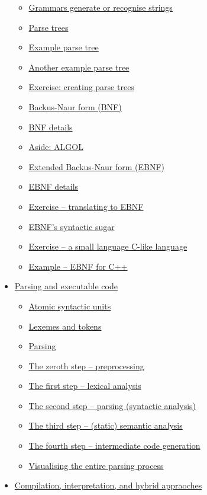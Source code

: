 \documentclass[11pt]{article}
\theoremstyle{definition}
\begin{document}
\begin{scriptsize}
\begin{itemize}
\begin{itemize}
\item \hyperref[sec:org4f12455]{Grammars generate or recognise strings}
\item \hyperref[sec:orga475d8c]{Parse trees}
\item \hyperref[sec:orgb22edea]{Example parse tree}
\item \hyperref[sec:org7b65470]{Another example parse tree}
\item \hyperref[sec:orgfb44648]{Exercise: creating parse trees}
\item \hyperref[sec:org7201aab]{Backus-Naur form (BNF)}
\item \hyperref[sec:orgcdc3693]{BNF details}
\item \hyperref[sec:orgee8aa97]{Aside: ALGOL}
\item \hyperref[sec:org41b6b47]{Extended Backus-Naur form (EBNF)}
\item \hyperref[sec:org326949e]{EBNF details}
\item \hyperref[sec:orgba7cfc1]{Exercise – translating to EBNF}
\item \hyperref[sec:orge66946e]{EBNF's syntactic sugar}
\item \hyperref[sec:org9cf9f20]{Exercise – a small language C-like language}
\item \hyperref[sec:org01a9da9]{Example – EBNF for C++}
\end{itemize}
\item \hyperref[sec:org68cc17f]{Parsing and executable code}
\begin{itemize}
\item \hyperref[sec:orgc07fd9a]{Atomic syntactic units}
\item \hyperref[sec:org0ea7aa0]{Lexemes and tokens}
\item \hyperref[sec:org6f52ff9]{Parsing}
\item \hyperref[sec:org9757a9b]{The zeroth step – preprocessing}
\item \hyperref[sec:org5dd76c0]{The first step – lexical analysis}
\item \hyperref[sec:org9e52d96]{The second step – parsing (syntactic analysis)}
\item \hyperref[sec:orgd94f1ec]{The third step – (static) semantic analysis}
\item \hyperref[sec:orge1d5e37]{The fourth step – intermediate code generation}
\item \hyperref[sec:orgac6abb0]{Visualising the entire parsing process}
\end{itemize}
\item \hyperref[sec:orgf4bc1ae]{Compilation, interpretation, and hybrid appraoches}

\end{itemize}
\end{scriptsize}
\end{document}
